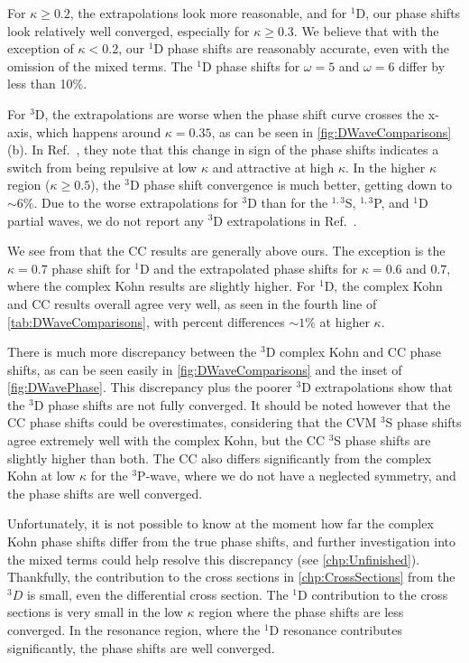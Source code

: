 \documentclass[Dissertation.tex]{subfiles}
\begin{document}
For $\kappa \geq 0.2$, the extrapolations look more reasonable, and for $^1$D,
our phase shifts look relatively well converged, especially for $\kappa \geq 0.3$.
We believe that with the exception of $\kappa < 0.2$, our $^1$D phase shifts are
reasonably accurate, even with the omission of the mixed terms. The $^1$D phase
shifts for $\omega = 5$ and $\omega = 6$ differ by less than 10\%.

For $^3$D, the extrapolations are worse when the phase shift curve crosses the
x-axis, which happens around $\kappa = 0.35$, as can be seen in
\cref{fig:DWaveComparisons}(b). In Ref.~\cite{Blackwood2002}, they note \label{DWaveSwitch} that
this change in sign of the phase shifts indicates a switch from being repulsive
at low $\kappa$ and attractive at high $\kappa$. In the higher
$\kappa$ region ($\kappa \geq 0.5$),
the $^3$D phase shift convergence is much better, getting down to $\sim\!6\%$.
Due to the worse extrapolations for $^3$D than for the $^{1,3}$S, $^{1,3}$P,
and $^1$D partial waves, we do not report any $^3$D extrapolations in
Ref.~\cite{Woods2015}.

We see from  that the CC results
\cite{Blackwood2002,Walters2004} are generally above ours. The exception is the
$\kappa = 0.7$ phase shift for $^1$D and the extrapolated phase shifts for
$\kappa = 0.6$ and $0.7$, where the complex Kohn results are slightly higher.
For $^1$D, the complex Kohn and CC \cite{Walters2004} results overall agree
very well, as seen in the fourth line of \cref{tab:DWaveComparisons}, with
percent differences $\sim\!1\%$ at higher $\kappa$.

There is much more discrepancy between the $^3$D complex Kohn and CC phase
shifts, as can be seen easily in \cref{fig:DWaveComparisons} and the inset of
\cref{fig:DWavePhase}. This discrepancy
plus the poorer $^3$D extrapolations show that the $^3$D phase shifts are not
fully converged. It should be noted however that the CC phase shifts could be
overestimates, considering that the CVM \cite{Zhang2012} $^3$S phase shifts
agree extremely well with the complex Kohn, but the CC $^3$S phase shifts are
slightly higher than both. The CC also differs significantly from the complex
Kohn at low $\kappa$ for the $^3$P-wave, where we do not have a neglected
symmetry, and the phase shifts are well converged.

Unfortunately, it is not possible to know at the moment how far the complex 
Kohn phase shifts differ from the true phase shifts, and further 
investigation into the mixed terms could help resolve this discrepancy
(see \cref{chp:Unfinished}). Thankfully, the contribution to the cross sections
in \cref{chp:CrossSections} from the $^3D$ is small, even the differential
cross section. The $^1$D contribution to the cross sections is very small
in the low $\kappa$ region where the phase shifts are less converged. In the
resonance region, where the $^1$D resonance contributes significantly, the
phase shifts are well converged.
\end{document}
